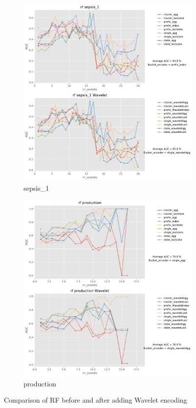 \documentclass[twoside,11pt]{Latex/Classes/PhDthesisPSnPDF}
\begin{document}
\begin{figure}[!htbp]
	\medskip
	\begin{subfigure}{0.48\textwidth}
		\includegraphics[width=\linewidth]{images/wavelet/graphs2rf/sepsis_1.pdf}	
		\caption{sepsis\_1} 
	\end{subfigure}\hspace*{\fill}
	\begin{subfigure}{0.48\textwidth}
		\includegraphics[width=\linewidth]{images/wavelet/graphs2rf/production.pdf}
		\caption{production}
	\end{subfigure}
		\caption{Comparison of RF before and after adding Wavelet encoding}
	\label{fig:wr1}
\end{figure}
\end{document}
